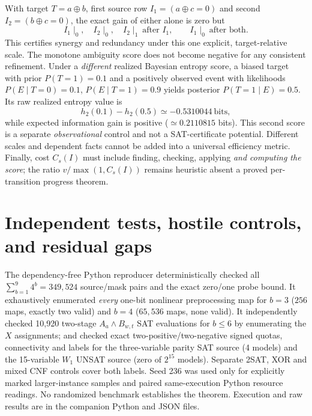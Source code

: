 \documentclass[10pt]{article}
\begin{document}
With target $T=a\oplus b$, first source row $I_1=(a\oplus c=0)$ and second $I_2=(b\oplus c=0)$, the exact gain of either alone is zero but
\[
 I_1\mid_0,\quad I_2\mid_0,\quad
 I_2\mid_{1}\ \text{after }I_1,\qquad I_1\mid_0\ \text{after both}.
\]
This certifies synergy and redundancy under this one explicit, target-relative scale. The monotone ambiguity score does not become negative for any consistent refinement. Under a \emph{different} realized Bayesian entropy score, a biased target with prior $P(T=1)=0.1$ and a positively observed event with likelihoods $P(E\mid T=0)=0.1$, $P(E\mid T=1)=0.9$ yields posterior $P(T=1\mid E)=0.5$. Its raw realized entropy value is
\[
 h_2(0.1)-h_2(0.5)\simeq-0.5310044\ \text{bits},
\]
while expected information gain is positive ($\simeq0.2110815$ bits). This second score is a separate \emph{observational} control and not a SAT-certificate potential. Different scales and dependent facts cannot be added into a universal efficiency metric. Finally, cost $C_s(I)$ must include finding, checking, applying \emph{and computing the score}; the ratio $v/\max(1,C_s(I))$ remains heuristic absent a proved per-transition progress theorem.

\section{Independent tests, hostile controls, and residual gaps}
The dependency-free Python reproducer deterministically checked all $\sum_{b=1}^{9}4^b=349{,}524$ source/mask pairs and the exact zero/one probe bound. It exhaustively enumerated \emph{every} one-bit nonlinear preprocessing map for $b=3$ ($256$ maps, exactly two valid) and $b=4$ ($65{,}536$ maps, none valid). It independently checked 10,920 two-stage $A_a\wedge B_{w,t}$ SAT evaluations for $b\le6$ by enumerating the $X$ assignments; and checked exact two-positive/two-negative signed quotas, connectivity and labels for the three-variable parity SAT source (4 models) and the 15-variable $W_1$ UNSAT source (zero of $2^{15}$ models). Separate 2SAT, XOR and mixed CNF controls cover both labels. Seed 236 was used only for explicitly marked larger-instance samples and paired same-execution Python resource readings. No randomized benchmark establishes the theorem. Execution and raw results are in the companion Python and JSON files.
\end{document}
